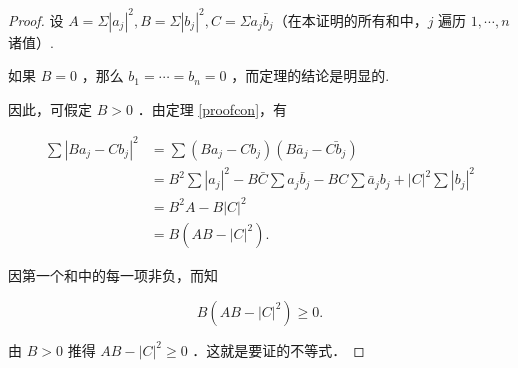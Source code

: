 \begin{proof}
	设 $A=\Sigma\left|a_j\right|^2, B=\Sigma\left|b_j\right|^2, C=\Sigma a_j \bar{b}_j$（在本证明的所有和中，$j$ 遍历 $1, \cdots, n$ 诸值）.
	
	如果 $B=0$ ，那么 $b_1=\cdots=b_n=0$ ，而定理的结论是明显的.
	
	因此，可假定 $B>0$ ．由定理 \ref{proofcon}，有
	
	$$
	\begin{aligned}
		\sum\left|B a_j-C b_j\right|^2 & =\sum\left(B a_j-C b_j\right)\left(B \bar{a}_j-\bar{Cb_j}\right) \\
		& =B^2 \sum\left|a_j\right|^2-B \bar{C} \sum a_j \bar{b}_j-B C \sum \bar{a}_j b_j+|C|^2 \sum\left|b_j\right|^2 \\
		& =B^2 A-B|C|^2 \\
		& =B\left(A B-|C|^2\right) .
	\end{aligned}
	$$
	
	
	因第一个和中的每一项非负，而知
	
	$$
	B\left(A B-|C|^2\right) \geqslant 0 .
	$$
	
	
	由 $B>0$ 推得 $A B-|C|^2 \geqslant 0$ ．这就是要证的不等式．
\end{proof}
